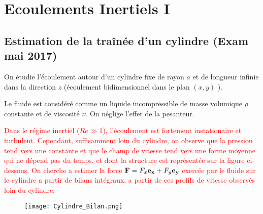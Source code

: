 
\setcounter{section}{6}



\section{Ecoulements Inertiels I }


\setcounter{subsection}{-1}



\subsection{Estimation de la traînée d'un cylindre (Exam mai 2017)}


On étudie l'écoulement autour d'un cylindre fixe de rayon $a$ et de longueur infinie dans la direction $z$ (écoulement bidimensionnel dans le plan $(x,y)$ ).

 Le fluide est considéré comme un liquide incompressible de masse volumique $\rho$ constante et de viscosité $\nu$. On néglige l'effet de la pesanteur.

\textcolor{red}{ Dans le régime inertiel ($Re \gg 1$), l'écoulement est fortement instationaire et turbulent. Cependant,
suffisamment loin du cylindre, on observe que la pression tend vers une constante et que le champ de vitesse tend vers une forme moyenne qui ne dépend pas du temps, et dont la structure est représentée sur la figure ci-dessous.
On cherche a estimer la force ${\bf F} = F_x {\bf e_x} + F_y {\bf e_y} $ exercée par le fluide sur le cylindre a partir de bilans intégraux,  a partir de ces profils de vitesse observés loin du cylindre.
}




\begin{figure}[htb]
  \begin{center}
      \texttt{[image: Cylindre\_Bilan.png]}
      \end{center}
      \vspace{-1cm}
\end{figure}

